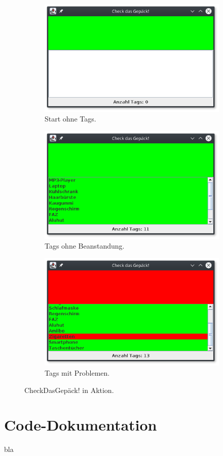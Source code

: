 \documentclass[paper=a4,fontsize=11pt,headsepline,footsepline,parskip=half]{scrartcl}
\begin{document}
\begin{figure}[h]
  \centering
  \begin{subfigure}[t]{.3\linewidth}
    \includegraphics[width=.95\linewidth]{screenshot0}
    \caption{Start ohne Tags.}
    \label{fig:start}
  \end{subfigure}%
  \hfill
  \begin{subfigure}[t]{.3\linewidth}
    \includegraphics[width=.95\linewidth]{screenshot1}
    \caption{Tags ohne Beanstandung.}
    \label{fig:green}
  \end{subfigure}
  \hfill
  \begin{subfigure}[t]{.3\linewidth}
    \includegraphics[width=.95\linewidth]{screenshot2}
    \caption{Tags mit Problemen.}
    \label{fig:red}
  \end{subfigure}%
  \caption{CheckDasGepäck! in Aktion.}
  \label{fig:app}
\end{figure}

\section{Code-Dokumentation}

bla
\end{document}
